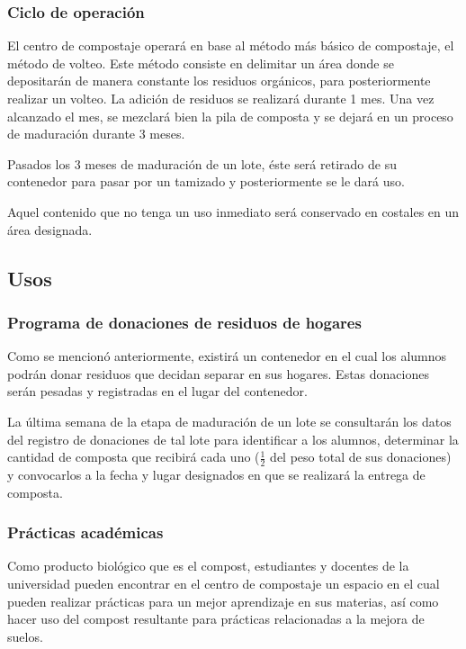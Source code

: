 \subsubsection{Ciclo de operación}

El centro de compostaje operará en base al método más básico de compostaje, el método de volteo. Este método consiste en delimitar un área donde se depositarán de manera constante los residuos orgánicos, para posteriormente realizar un volteo. La adición de residuos se realizará durante 1 mes. Una vez alcanzado el mes, se mezclará bien la pila de composta y se dejará en un proceso de maduración durante 3 meses.

Pasados los 3 meses de maduración de un lote, éste será retirado de su contenedor para pasar por un tamizado y posteriormente se le dará uso.

Aquel contenido que no tenga un uso inmediato será conservado en costales en un área designada.

\subsection{Usos}

\subsubsection{Programa de donaciones de residuos de hogares}

Como se mencionó anteriormente, existirá un contenedor en el cual los alumnos podrán donar residuos que decidan separar en sus hogares. Estas donaciones serán pesadas y registradas en el lugar del contenedor.

La última semana de la etapa de maduración de un lote se consultarán los datos del registro de donaciones de tal lote para identificar a los alumnos, determinar la cantidad de composta que recibirá cada uno ($\frac{1}{2}$ del peso total de sus donaciones) y convocarlos a la fecha y lugar designados en que se realizará la entrega de composta.

\subsubsection{Prácticas académicas}

Como producto biológico que es el compost, estudiantes y docentes de la universidad pueden encontrar en el centro de compostaje un espacio en el cual pueden realizar prácticas para un mejor aprendizaje en sus materias, así como hacer uso del compost resultante para prácticas relacionadas a la mejora de suelos.

